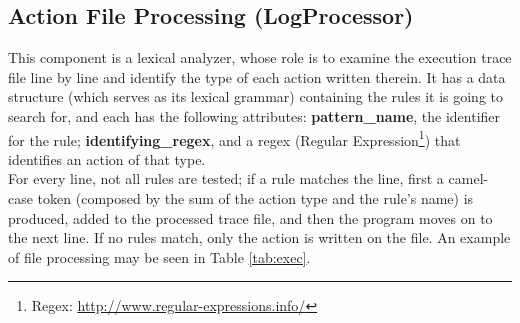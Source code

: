\documentclass[conference]{IEEEtran}
\begin{document}
\subsection{Action File Processing (LogProcessor)}\label{sec:fp}

This component is a lexical analyzer, whose role is to examine the execution trace file line by line and identify the type of each action written therein. It has a data structure (which serves as its lexical grammar) containing the rules it is going to search for, and each has the following attributes: \textbf{pattern\_name}, the identifier for the rule; \textbf{identifying\_regex}, and a regex (Regular Expression\footnote{Regex: \url{http://www.regular-expressions.info/}}) that identifies an action of that type. \\

For every line, not all rules are tested; if a rule matches the line, first a camel-case token (composed by the sum of the action type and the rule's name) is produced, added to the processed trace file, and then the program moves on to the next line. If no rules match, only the action is written on the file. An example of file processing may be seen in Table \ref{tab:exec}.\\
\end{document}
